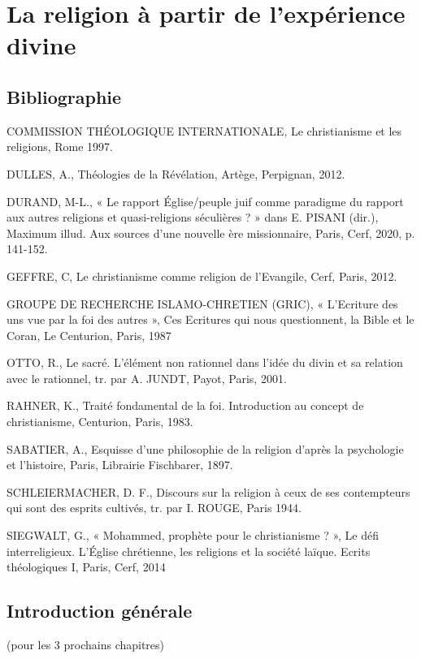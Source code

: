 \chapter{La religion à partir de l’expérience divine}


\section{Bibliographie}
COMMISSION THÉOLOGIQUE INTERNATIONALE, Le christianisme et les religions, Rome 1997. 

DULLES, A., Théologies de la Révélation, Artège, Perpignan, 2012. 

DURAND, M-L., « Le rapport Église/peuple juif comme paradigme du rapport aux autres religions et quasi-religions séculières ? » dans E. PISANI (dir.), Maximum illud. Aux sources d’une nouvelle ère missionnaire, Paris, Cerf, 2020, p. 141-152. 

GEFFRE, C, Le christianisme comme religion de l’Evangile, Cerf, Paris, 2012. 

GROUPE DE RECHERCHE ISLAMO-CHRETIEN (GRIC), « L’Ecriture des uns vue par la foi des autres », Ces Ecritures qui nous questionnent, la Bible et le Coran, Le Centurion, Paris, 1987 

OTTO, R., Le sacré. L’élément non rationnel dans l’idée du divin et sa relation avec le rationnel, tr. par A. JUNDT, Payot, Paris, 2001. 

RAHNER, K., Traité fondamental de la foi. Introduction au concept de christianisme, Centurion, Paris, 1983. 

SABATIER, A., Esquisse d’une philosophie de la religion d’après la psychologie et l’histoire, Paris, Librairie Fischbarer, 1897. 

SCHLEIERMACHER, D. F., Discours sur la religion à ceux de ses contempteurs qui sont des esprits cultivés, tr. par I. ROUGE, Paris 1944. 

SIEGWALT, G., « Mohammed, prophète pour le christianisme ? », Le défi interreligieux. L’Église chrétienne, les religions et la société laïque. Ecrits théologiques I, Paris, Cerf, 2014 



\section{Introduction générale }


(pour les 3 prochains chapitres) 

